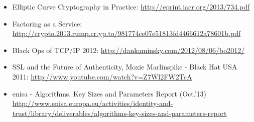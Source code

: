 \begin{itemize}
\item Elliptic Curve Cryptography in Practice: \url{http://eprint.iacr.org/2013/734.pdf}
\item Factoring as a Service: \url{http://crypto.2013.rump.cr.yp.to/981774ce07e51813fd4466612a78601b.pdf}
\item Black Ops of TCP/IP 2012: \url{http://dankaminsky.com/2012/08/06/bo2012/}
\item SSL and the Future of Authenticity, Moxie Marlinspike - Black Hat USA 2011: \url{http://www.youtube.com/watch?v=Z7Wl2FW2TcA}
\item enisa - Algorithms, Key Sizes and Parameters Report (Oct.'13) \url{http://www.enisa.europa.eu/activities/identity-and-trust/library/deliverables/algorithms-key-sizes-and-parameters-report}

\end{itemize}
